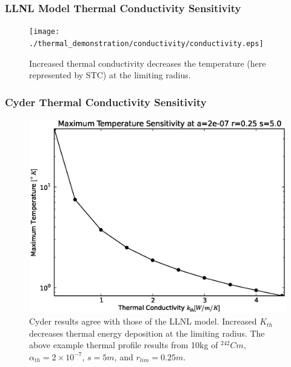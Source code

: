 

\begin{frame}[ctb!]
\frametitle{LLNL Model Thermal Conductivity Sensitivity}

\begin{figure}[htbp!]
\begin{center}
\texttt{[image: ./thermal\_demonstration/conductivity/conductivity.eps]}
\end{center}
\caption[$K_{th}$ Sensitivity in LLNL Model]{Increased thermal conductivity 
decreases the temperature (here represented by STC) at the limiting radius.}
\label{fig:Cm242Kth_alpha_low}
\end{figure}

\end{frame}


\begin{frame}[ctb!]
\frametitle{Cyder Thermal Conductivity Sensitivity}
\begin{figure}[htbp!]
\begin{center}
\includegraphics[height=0.7\textheight]{./thermal_demonstration/conductivity/conductivity_cyder.eps}
\end{center}
\caption[$K_{th}$ Sensitivity in Cyder]
{Cyder results agree with those of the LLNL model. Increased $K_{th}$ decreases 
thermal energy deposition at the limiting radius. The above example thermal 
profile results from 10kg of $^{242}Cm$, $\alpha_{th}=2\times 10^{-7}$, $s=5m$, 
and $r_{lim}=0.25m$.}
\label{fig:kr}
\end{figure}
\end{frame}



